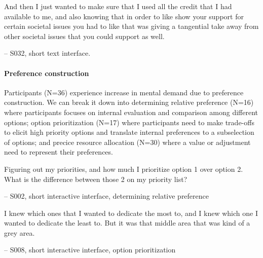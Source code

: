 \begin{displayquote}
And then I just wanted to make sure that I used all the credit that I had available to me, and also knowing that in order to like show your support for certain societal issues you had to like that was giving a tangential take away from other societal issues that you could support as well.
    
\noindent \hfill -- S032, short text interface.
\end{displayquote}

\paragraph{Preference construction} Participants (N=36) experience increase in mental demand due to preference construction. We can break it down into determining relative preference (N=16) where participants focuses on internal evaluation and comparison among different options; option prioritization (N=17) where participants need to make trade-offs to elicit high priority options and translate internal preferences to a subselection of options; and precice resource allocation (N=30) where a value or adjustment need to represent their preferences.

\begin{displayquote}
Figuring out my priorities, and how much I prioritize option 1 over option 2. What is the difference between those 2 on my priority list?

\hfill -- S002, short interactive interface, determining relative preference
\end{displayquote}


\begin{displayquote}
I knew which ones that I wanted to dedicate the most to, and I knew which one I wanted to dedicate the least to. But it was that middle area that was kind of a grey area.
    
\noindent \hfill -- S008, short interactive interface, option prioritization
\end{displayquote}



